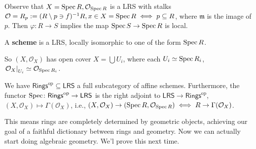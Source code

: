 Observe that $X=\operatorname{Spec} R, \mathcal{O} _{\operatorname{Spec} R}$ is a LRS with stalks $\mathcal{O} = R_p := (R \setminus p \ni f) ^{-1}R, x \in X =\operatorname{Spec} R \iff p \subseteq  R$, where $\mathfrak m$ is the image of $p$. Then $\varphi  \colon R \to S$ implies the map $\operatorname{Spec} S \to \operatorname{Spec} R$ is local.

\begin{definition}[]
    A \textbf{scheme} is a LRS, locally isomorphic to one of the form $\operatorname{Spec} R$.
\end{definition}
So $(X, \mathcal{O} _X)$ has open cover $X= \bigcup U_i $, where each $U _i  \simeq  \operatorname{Spec} R_i $, $\left. \mathcal{O} _X \right| _{U_i }\simeq  \mathcal{O} _{\operatorname{Spec} R _i }$.
    \begin{theorem}
        We have $\mathsf{Rings} ^{\mathrm{op}}\subseteq  \mathsf{LRS} $ a full subcategory of affine schemes. Furthermore, the functor $\operatorname{Spec} \colon \mathsf{Rings} ^{\mathrm{op}} \to \mathsf{LRS} $ is the right adjoint to $\mathsf{LRS}  \to \mathsf{Rings} ^{\mathrm{op}}$, $(X,\mathcal{O} _X) \mapsto  \Gamma(\mathcal{O} _X)$, i.e., $(X,\mathcal{O} _X) \to (\operatorname{Spec} R, \mathcal{O}_{\operatorname{Spec} R}) \iff R \to \Gamma(\mathcal{O} _X)$.
    \end{theorem}
    This means rings are completely determined by geometric objects, achieving our goal of a faithful dictionary between rings and geometry. Now we can actually start doing algebraic geometry. We'l prove this next time.
